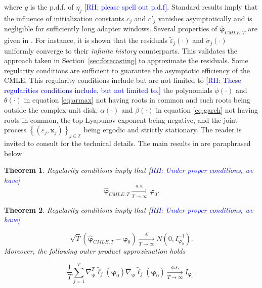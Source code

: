 \documentclass[10pt,a4paper,oneside]{article}
\newcommand{\Z}{\mathbb{Z}}
\newcommand{\rh}[1]{\textcolor{blue}{\textsf{[RH: #1]}}}
\newtheorem{theorem}{Theorem}
\begin{document}
where $g$ is the p.d.f. of $\eta_j$ \rh{please spell out p.d.f}. Standard results imply that the influence of initialization constants $c_j$ and $c'_j$ vanishes asymptotically and is negligible for sufficiently long adapter windows. Several properties of $\hat{\boldsymbol{\varphi}}_{CMLE, T}$ are given in \cite{mejia2025asymptotic}. For instance, it is shown that the residuals $\tilde{\varepsilon}_j(\cdot)$ and $\tilde{\sigma}_j(\cdot)$ uniformly converge to their \textit{infinite history} counterparts. This validates the approach taken in Section~\ref{sec:forecasting} to approximate the residuals. Some regularity conditions are sufficient to guarantee the asymptotic efficiency of the CMLE. This regularity conditions include but are not limited to \rh{These regularities conditions include, but not limited to,} the polynomials $\phi(\cdot)$ and $\theta(\cdot)$ in equation \eqref{eq:armax} not having roots in common and such roots being outside the complex unit disk, $\alpha(\cdot)$ and $\beta(\cdot)$ in equation \eqref{eq:garch} not having roots in common, the top Lyapunov exponent being negative, and the joint process $\left\{ \left( \varepsilon_j, \mathbf{x}_j \right)  \right\}_{j \in \Z}$ being ergodic and strictly stationary. The reader is invited to consult \cite{mejia2025asymptotic} for the technical details. The main results in \cite{mejia2025asymptotic} are paraphrased below

\begin{theorem}
    Regularity conditions imply that \rh{Under proper conditions, we have}
    $$
        \hat{\boldsymbol{\varphi}}_{CMLE, T} \xrightarrow[T \rightarrow \infty]{a.s.} \boldsymbol{\varphi}_0.
    $$
    \label{thm:consistency}
\end{theorem}

\begin{theorem}
    Regularity conditions imply that \rh{Under proper conditions, we have}

    $$
        \sqrt{T} (\hat{\boldsymbol{\varphi}}_{CMLE, T} - \boldsymbol{\varphi}_0) \xrightarrow[T \rightarrow \infty]{\mathcal{L}} N \left(0, I^{-1}_{\boldsymbol{\varphi}_0} \right).
    $$
    Moreover, the following outer product approximation holds

    $$
        \frac{1}{T} \sum^T_{j = 1} \nabla^T_{\boldsymbol{\varphi}} \tilde{\ell}_j(\boldsymbol{\varphi}_0) \nabla_{\boldsymbol{\varphi}} \tilde{\ell}_j(\boldsymbol{\varphi}_0) \xrightarrow[T \rightarrow \infty]{a.s.} I_{\boldsymbol{\varphi}_0}.
    $$
    \label{thm:asymptotic_normality}
\end{theorem}
\end{document}
